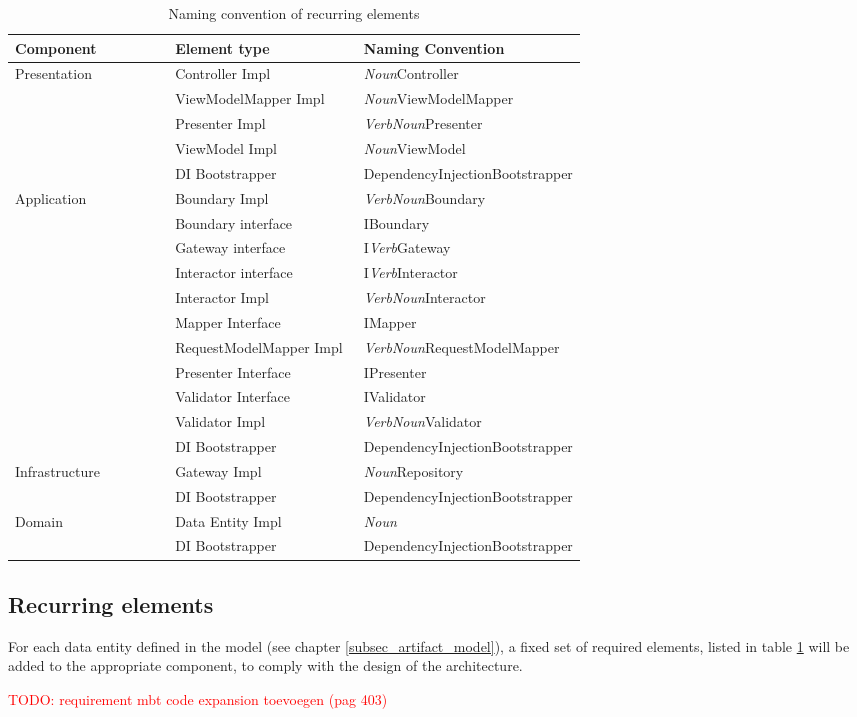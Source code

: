\begin{table}[ht]
    \small
    \begin{tabular}{ l p{0.33\linewidth} p{0.39\linewidth} }
    \hline
    \textbf{Component} & \textbf{Element type} & \textbf{Naming Convention} \\ \hline
    Presentation & Controller Impl & \textit{Noun}Controller \\
    & ViewModelMapper Impl & \textit{Noun}ViewModelMapper \\
    & Presenter Impl & \textit{VerbNoun}Presenter \\
    & ViewModel Impl & \textit{Noun}ViewModel \\
    & DI Bootstrapper & DependencyInjectionBootstrapper \\ \hline

    Application & Boundary Impl & \textit{VerbNoun}Boundary \\
    & Boundary interface & IBoundary \\
    & Gateway interface & I\textit{Verb}Gateway \\
    & Interactor interface & I\textit{Verb}Interactor \\
    & Interactor Impl & \textit{VerbNoun}Interactor \\
    & Mapper Interface & IMapper \\
    & RequestModelMapper Impl & \textit{VerbNoun}RequestModelMapper \\
    & Presenter Interface & IPresenter \\
    & Validator Interface & IValidator \\
    & Validator Impl & \textit{VerbNoun}Validator \\
    & DI Bootstrapper & DependencyInjectionBootstrapper \\ \hline
    
    Infrastructure & Gateway Impl & \textit{Noun}Repository \\
    & DI Bootstrapper & DependencyInjectionBootstrapper \\ \hline

    Domain & Data Entity Impl & \textit{Noun} \\
    & DI Bootstrapper & DependencyInjectionBootstrapper \\ \hline
    \end{tabular}
    \caption{Naming convention of recurring elements}
    \label{table:element_naming_convention}
\end{table}

    \subsection{Recurring elements}
    
    For each data entity defined in the model (see chapter \ref{subsec_artifact_model}), a
    fixed set of required elements, listed in table \ref{table:element_naming_convention}
    will be added to the appropriate component, to comply with the design of the
    architecture.

    \textcolor{red}{TODO: requirement mbt code expansion toevoegen (pag 403)}